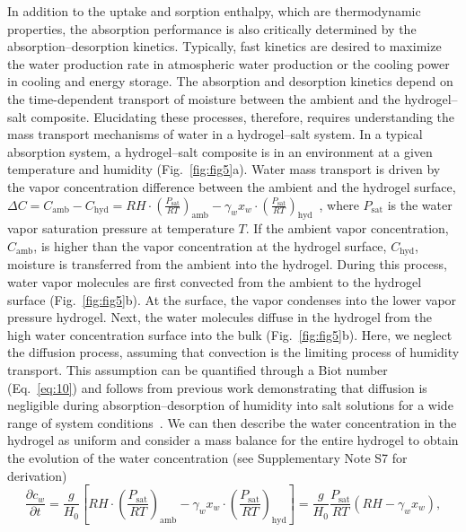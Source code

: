 \documentclass[11pt]{article}
\begin{document}
In addition to the uptake and sorption enthalpy, which are thermodynamic properties, the absorption performance is also critically determined by the absorption--desorption kinetics. Typically, fast kinetics are desired to maximize the water production rate in atmospheric water production or the cooling power in cooling and energy storage. The absorption and desorption kinetics depend on the time-dependent transport of moisture between the ambient and the hydrogel--salt composite. Elucidating these processes, therefore, requires understanding the mass transport mechanisms of water in a hydrogel--salt system. In a typical absorption system, a hydrogel--salt composite is in an environment at a given temperature and humidity (Fig.~\ref{fig:fig5}a). Water mass transport is driven by the vapor concentration difference between the ambient and the hydrogel surface, $\Delta C = C_{\mathrm{amb}} - C_{\mathrm{hyd}} = RH \cdot \left(\frac{P_{\mathrm{sat}}}{RT}\right)_{\mathrm{amb}} - \gamma_w x_w \cdot \left(\frac{P_{\mathrm{sat}}}{RT}\right)_{\mathrm{hyd}}$~\cite{diazmarin2024a}, where $P_{\mathrm{sat}}$ is the water vapor saturation pressure at temperature $T$. If the ambient vapor concentration, $C_{\mathrm{amb}}$, is higher than the vapor concentration at the hydrogel surface, $C_{\mathrm{hyd}}$, moisture is transferred from the ambient into the hydrogel. During this process, water vapor molecules are first convected from the ambient to the hydrogel surface (Fig.~\ref{fig:fig5}b). At the surface, the vapor condenses into the lower vapor pressure hydrogel. Next, the water molecules diffuse in the hydrogel from the high water concentration surface into the bulk (Fig.~\ref{fig:fig5}b). Here, we neglect the diffusion process, assuming that convection is the limiting process of humidity transport. This assumption can be quantified through a Biot number (Eq.~\ref{eq:10}) and follows from previous work demonstrating that diffusion is negligible during absorption--desorption of humidity into salt solutions for a wide range of system conditions~\cite{diazmarin2024a}. We can then describe the water concentration in the hydrogel as uniform and consider a mass balance for the entire hydrogel to obtain the evolution of the water concentration (see Supplementary Note S7 for derivation)
\begin{equation}
\frac{\partial c_w}{\partial t} = \frac{g}{H_0}\left[RH \cdot \left(\frac{P_{\mathrm{sat}}}{RT}\right)_{\mathrm{amb}} - \gamma_w x_w \cdot \left(\frac{P_{\mathrm{sat}}}{RT}\right)_{\mathrm{hyd}}\right] = \frac{g}{H_0} \frac{P_{\mathrm{sat}}}{RT}\left(RH - \gamma_w x_w\right),
\label{eq:8}
\end{equation}
\end{document}
